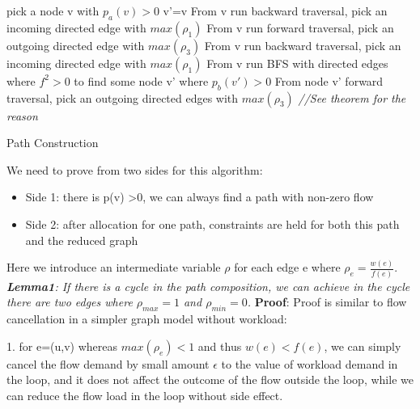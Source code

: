 \documentclass{sig-alternate}
\begin{document}
\begin{algorithm}\label {Path Construction}
\SetAlgoLined
\BlankLine
pick a node v with $p_a(v)>0$\;
{
v'=v\;
From v run backward traversal, pick an incoming directed edge with $ max( \rho_1 )  $ \;
From v run forward traversal, pick an outgoing directed edge with $ max(\rho_3 ) $\; }
\uElse
{
From v run backward traversal, pick an incoming directed edge with $ max( \rho_1 )  $ \;
From v run BFS with directed edges where $f^2>0$ to find some node v' where $p_b(v')>0$\;
From node v' forward traversal, pick an outgoing directed edges with $ max(\rho_3 ) $ \;
}
\emph{//See theorem for the reason}\;
\caption{ Path Construction}
\end{algorithm}




We need to prove from two sides for this algorithm: 
\begin{itemize}
  \item {Side 1: there is p(v) >0, we can always find a path with non-zero flow}
   \item {Side 2: after allocation for one path, constraints are held for both this path and the reduced graph} 
\newline
\end{itemize}
Here we introduce an intermediate variable $\rho$ for each edge e where $\rho_{e} = \frac{ w(e)}{f(e)}$.
\newline
\textit{\textbf{Lemma1}: If there is a cycle in the path composition, we can achieve in the cycle there are two edges where  $\rho_{max}= 1$ and $\rho_{min} = 0$. }
\newline
\textbf{Proof}: 
\newline
Proof is similar to flow cancellation in a simpler graph model without workload: 

1. for e=(u,v) whereas $max(\rho_{e})<1$ and thus $w(e) <f(e)$, we can simply cancel the flow demand by small amount $\epsilon$ to the value of workload demand in the loop, and it does not affect the outcome of the flow outside the loop, while we can reduce the flow load in the loop without side effect. 
\end{document}
